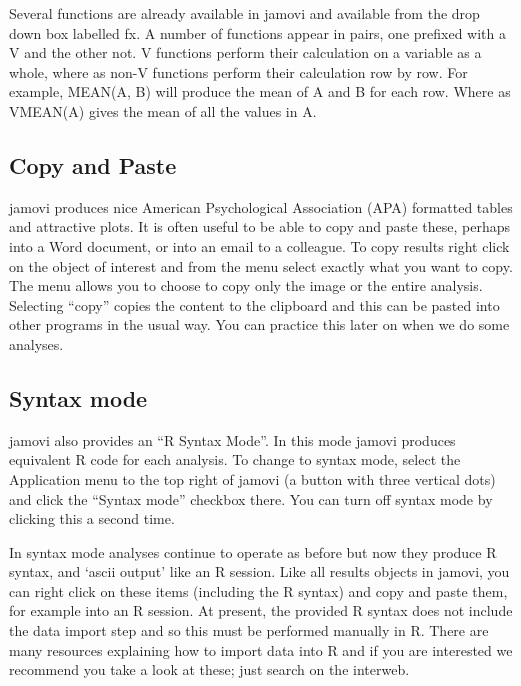 \documentclass[
]{book}
\begin{document}
Several functions are already available in jamovi and available from the drop down box labelled fx. A number of functions appear in pairs, one prefixed with a V and the other not. V functions perform their calculation on a variable as a whole, where as non-V functions perform their calculation row by row. For example, MEAN(A, B) will produce the mean of A and B for each row. Where as VMEAN(A) gives the mean of all the values in A.

\hypertarget{copy-and-paste}{%
\subsection{Copy and Paste}\label{copy-and-paste}}

jamovi produces nice American Psychological Association (APA) formatted tables and attractive plots. It is often useful to be able to copy and paste these, perhaps into a Word document, or into an email to a colleague. To copy results right click on the object of interest and from the menu select exactly what you want to copy. The menu allows you to choose to copy only the image or the entire analysis. Selecting ``copy'' copies the content to the clipboard and this can be pasted into other programs in the usual way. You can practice this later on when we do some analyses.

\hypertarget{syntax-mode}{%
\subsection{Syntax mode}\label{syntax-mode}}

jamovi also provides an ``R Syntax Mode''. In this mode jamovi produces equivalent R code for each analysis. To change to syntax mode, select the Application menu to the top right of jamovi (a button with three vertical dots) and click the ``Syntax mode'' checkbox there. You can turn off syntax mode by clicking this a second time.

In syntax mode analyses continue to operate as before but now they produce R syntax, and `ascii output' like an R session. Like all results objects in jamovi, you can right click on these items (including the R syntax) and copy and paste them, for example into an R session. At present, the provided R syntax does not include the data import step and so this must be performed manually in R. There are many resources explaining how to import data into R and if you are interested we recommend you take a look at these; just search on the interweb.
\end{document}
